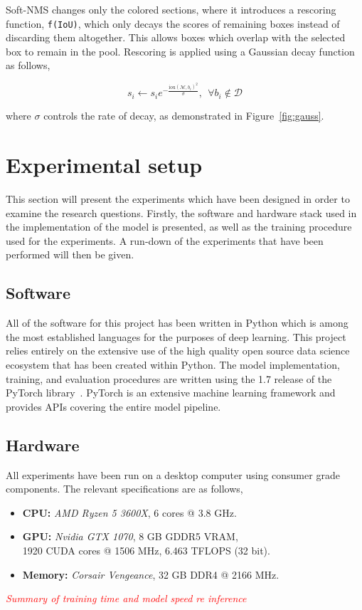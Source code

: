 Soft-NMS changes only the colored sections, where it introduces a rescoring function, \texttt{f(IoU)}, which only decays the scores of remaining boxes instead of discarding them altogether. %
This allows boxes which overlap with the selected box to remain in the pool.
Rescoring is applied using a Gaussian decay function as follows,

\[s_i\leftarrow s_i e^{-\frac{\text{iou}{(\mathcal{M}, b_i)}^2}{\sigma}},~~\forall b_i \notin \mathcal{D}\]

where \( \sigma \) controls the rate of decay, as demonstrated in Figure~\ref{fig:gauss}.

\section{Experimental setup}\label{sec:method-exp-setup}
This section will present the experiments which have been designed in order to examine the research questions.
Firstly, the software and hardware stack used in the implementation of the model is presented, as well as the training procedure used for the experiments.
A run-down of the experiments that have been performed will then be given.

\subsection{Software}
All of the software for this project has been written in Python which is among the most established languages for the purposes of deep learning.
This project relies entirely on the extensive use of the high quality open source data science ecosystem that has been created within Python.
The model implementation, training, and evaluation procedures are written using the 1.7 release of the PyTorch library\ \parencite{NEURIPS2019_9015}.
PyTorch is an extensive machine learning framework and provides APIs covering the entire model pipeline.

\subsection{Hardware}
All experiments have been run on a desktop computer using consumer grade components.
The relevant specifications are as follows,
\begin{itemize}
  \item \textbf{CPU:} \textit{AMD Ryzen 5 3600X}, 6 cores @ 3.8 GHz.
  \item \textbf{GPU:} \textit{Nvidia GTX 1070}, 8 GB GDDR5 VRAM,\\1920 CUDA cores @ 1506 MHz, 6.463 TFLOPS (32 bit).
  \item \textbf{Memory:} \textit{Corsair Vengeance}, 32 GB DDR4 @ 2166 MHz.
\end{itemize}
{\it
\textcolor{red}{Summary of training time and model speed re inference}
}
